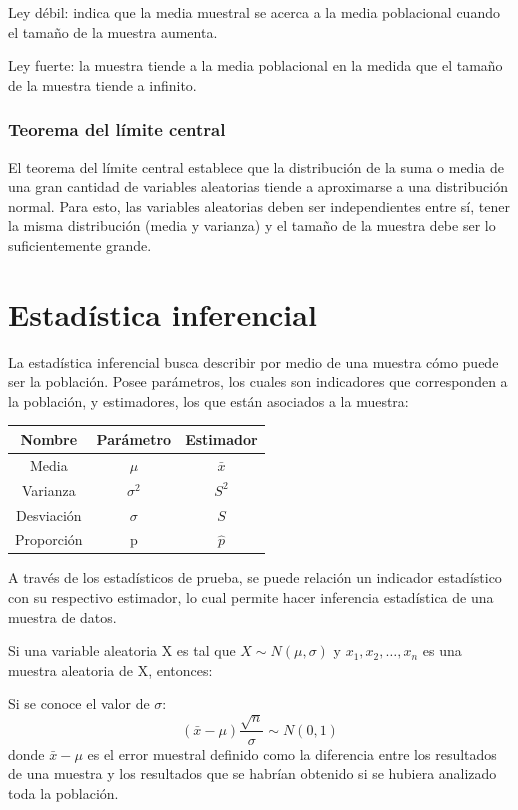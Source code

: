 \documentclass[a4paper, 12pt]{book}
\begin{document}
Ley débil: indica que la media muestral se acerca a la media poblacional cuando el tamaño de la muestra aumenta.

Ley fuerte: la muestra tiende a la media poblacional en la medida que el tamaño de la muestra tiende a infinito.

\subsubsection{Teorema del límite central}
El teorema del límite central establece que la distribución de la suma o media de una gran cantidad de variables aleatorias tiende a aproximarse a una distribución normal. Para esto, las variables aleatorias deben ser independientes entre sí, tener la misma distribución (media y varianza) y el tamaño de la muestra debe ser lo suficientemente grande.

\section{Estadística inferencial}
La estadística inferencial busca describir por medio de una muestra cómo puede ser la población. Posee parámetros, los cuales son indicadores que corresponden a la población, y estimadores, los que están asociados a la muestra:

\begin{center}
	\begin{tabular}{|c|c|c|}
		\hline
		Nombre & Parámetro & Estimador \\
		\hline
		Media & $\mu$ & $\bar{x}$ \\
		\hline
		Varianza & $\sigma^2$ & $S^{2}$ \\
		\hline
		Desviación & $\sigma$ & $S$ \\
		\hline
		Proporción & p & $\hat{p}$ \\
		\hline
	\end{tabular}
\end{center}

A través de los estadísticos de prueba, se puede relación un indicador estadístico con su respectivo estimador, lo cual permite hacer inferencia estadística de una muestra de datos.

Si una variable aleatoria X es tal que $X \sim N(\mu,\sigma)$ y ${x_1, x_2, \hdots, x_n}$ es una muestra aleatoria de X, entonces:

Si se conoce el valor de $\sigma$:
\begin{equation}
	(\bar{x}-\mu) \frac{\sqrt{n}}{\sigma} \sim N(0,1)
\end{equation}
donde $\bar{x}-\mu$ es el error muestral definido como la diferencia entre los resultados de una muestra y los resultados que se habrían obtenido si se hubiera analizado toda la población.
\end{document}
